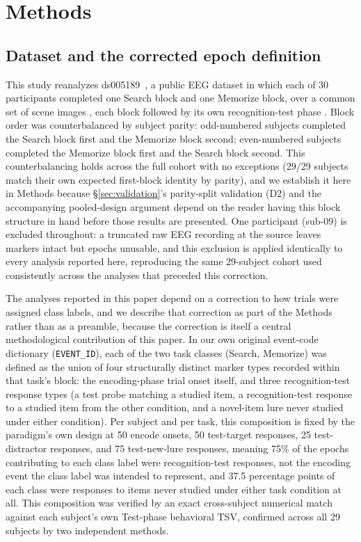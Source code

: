 \documentclass[preprint,12pt]{elsarticle}
\begin{document}
\section{Methods}\label{sec:methods}

\subsection{Dataset and the corrected epoch definition}\label{sec:dataset}

This study reanalyzes ds005189~\cite{helbing2025}, a public EEG dataset in which each of 30 participants completed one Search block and one Memorize block, over a common set of scene images \cite{draschkow2017,draschkowwolfe2014,vohenderson2009,woodmanluck2003}, each block followed by its own recognition-test phase \cite{polich2007}. Block order was counterbalanced by subject parity: odd-numbered subjects completed the Search block first and the Memorize block second; even-numbered subjects completed the Memorize block first and the Search block second. This counterbalancing holds across the full cohort with no exceptions (29/29 subjects match their own expected first-block identity by parity), and we establish it here in Methods because \S\ref{sec:validation}'s parity-split validation (D2) and the accompanying pooled-design argument depend on the reader having this block structure in hand before those results are presented. One participant (sub-09) is excluded throughout: a truncated raw EEG recording at the source leaves markers intact but epochs unusable, and this exclusion is applied identically to every analysis reported here, reproducing the same 29-subject cohort used consistently across the analyses that preceded this correction.

The analyses reported in this paper depend on a correction to how trials were assigned class labels, and we describe that correction as part of the Methods rather than as a preamble, because the correction is itself a central methodological contribution of this paper. In our own original event-code dictionary (\texttt{EVENT\_ID}), each of the two task classes (Search, Memorize) was defined as the union of four structurally distinct marker types recorded within that task's block: the encoding-phase trial onset itself, and three recognition-test response types (a test probe matching a studied item, a recognition-test response to a studied item from the other condition, and a novel-item lure never studied under either condition). Per subject and per task, this composition is fixed by the paradigm's own design at 50 encode onsets, 50 test-target responses, 25 test-distractor responses, and 75 test-new-lure responses, meaning 75\% of the epochs contributing to each class label were recognition-test responses, not the encoding event the class label was intended to represent, and 37.5 percentage points of each class were responses to items never studied under either task condition at all. This composition was verified by an exact cross-subject numerical match against each subject's own Test-phase behavioral TSV, confirmed across all 29 subjects by two independent methods.
\end{document}
